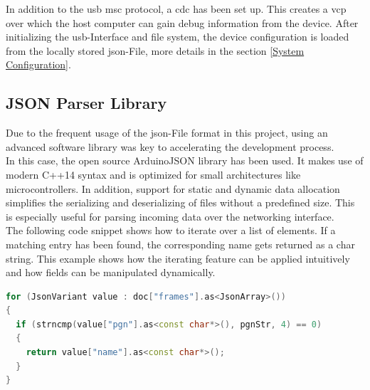In addition to the \acrshort{usb} \acrshort{msc} protocol, a \acrfull{cdc} has been set up. This creates a \acrfull{vcp} over which the host computer can gain debug information from the device. \newline
After initializing the \acrshort{usb}-Interface and file system, the device configuration is loaded from the locally stored \acrshort{json}-File, more details in the section \ref{System Configuration}.

\subsection{JSON Parser Library} \label{JSON Parser Library}
Due to the frequent usage of the \acrshort{json}-File format in this project, using an advanced software library was key to accelerating the development process. \\
In this case, the open source ArduinoJSON library has been used. It makes use of modern C++14 syntax and is optimized for small architectures like microcontrollers. In addition, support for static and dynamic data allocation simplifies the serializing and deserializing of files without a predefined size. This is especially useful for parsing incoming data over the networking interface. \\[0.5em]
The following code snippet shows how to iterate over a list of elements. If a matching entry has been found, the corresponding name gets returned as a char string. This example shows how the iterating feature can be applied intuitively and how fields can be manipulated dynamically.

\bigskip
{}
\begin{lstlisting}[backgroundcolor=\color{gray!10},  
                   basicstyle=\ttfamily,
                   columns=fullflexible,
                   breakatwhitespace=false,      
                   breaklines=true,                
                   captionpos=b,                    
                   commentstyle=\color{mygreen}, 
                   extendedchars=true,              
                   frame=single,                   
                   keepspaces=true,             
                   keywordstyle=\color{blue},      
                   language=c++,                 
                   numbers=none,                
                   numbersep=5pt,                   
                   numberstyle=\tiny\color{blue}, 
                   rulecolor=\color{mygray},        
                   showspaces=false,
                   showstringspaces=false,
                   showtabs=false,                 
                   stepnumber=5,                  
                   stringstyle=\color{mymauve},    
                   tabsize=2,                      
                   title=\lstname,
                   frame=none,
                   xleftmargin = 1cm,
                   framexleftmargin = 1em]
for (JsonVariant value : doc["frames"].as<JsonArray>())
{
  if (strncmp(value["pgn"].as<const char*>(), pgnStr, 4) == 0)
  {
    return value["name"].as<const char*>();
  }
}
\end{lstlisting}


